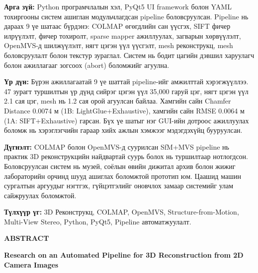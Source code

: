 \noindent\textbf{Арга зүй:}
Python програмчлалын хэл, PyQt5 UI framework болон YAML тохиргооны систем ашиглан модульчлагдсан pipeline боловсруулсан. Pipeline нь дараах 9 үе шатаас бүрдэнэ: COLMAP өгөгдлийн сан үүсгэх, SIFT фичер илрүүлэлт, фичер тохиролт, sparse mapper ажиллуулах, загварын хөрвүүлэлт, OpenMVS-д шилжүүлэлт, нягт цэгэн үүл үүсгэлт, mesh реконструкц, mesh боловсруулалт болон текстур зураглал. Систем нь бодит цагийн дэвшил харуулагч болон ажиллагааг зогсоох (abort) боломжийг агуулна.

\vspace{0.3cm}

\noindent\textbf{Үр дүн:}
Бүрэн ажиллагаатай 9 үе шаттай pipeline-ийг амжилттай хэрэгжүүллээ. 47 зурагт туршилтын үр дүнд сийрэг цэгэн үүл 35,000 гаруй цэг, нягт цэгэн үүл 2.1 сая цэг, mesh нь 1.2 сая орой агуулсан байлаа. Хамгийн сайн Chamfer Distance 0.0074 м (1B: LightGlue+Exhaustive), хамгийн сайн RMSE 0.0064 м (1A: SIFT+Exhaustive) гарсан. Бүх үе шатыг нэг GUI-ийн дотроос ажиллуулах боломж нь хэрэглэгчийн гараар хийх ажлын хэмжээг мэдэгдэхүйц бууруулсан.

\vspace{0.3cm}

\noindent\textbf{Дүгнэлт:}
COLMAP болон OpenMVS-д суурилсан SfM+MVS pipeline нь практик 3D реконструкцийн
найдвартай суурь болох нь туршилтаар нотлогдсон. Боловсруулсан систем нь музей,
соёлын өвийн дижитал архив болон жижиг лабораторийн орчинд шууд ашиглах боломжтой
прототип юм. Цаашид машин сургалтын аргуудыг нэгтгэх, гүйцэтгэлийг оновчлох замаар
системийг улам сайжруулах боломжтой.

\vspace{0.3cm}

\noindent\textbf{Түлхүүр үг:}
3D Реконструкц, COLMAP, OpenMVS, Structure-from-Motion, Multi-View Stereo, Python, PyQt5, Pipeline автоматжуулалт.

\clearpage

\begin{center}
{\Large\bfseries ABSTRACT}
\end{center}

\vspace{0.5cm}

\begin{center}
{\fontsize{14pt}{16pt}\selectfont \textbf{Research on an Automated Pipeline for 3D Reconstruction from 2D Camera Images}}
\end{center}

